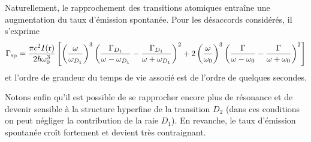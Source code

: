 Naturellement, le rapprochement des transitions atomiques entraîne une augmentation du taux d'émission spontanée. Pour les désaccords considérés, il s'exprime
\begin{equation}
\Gamma_{\mathrm{sp}}=\frac{\pi c^2 I(\mathrm{r})}{2 \hslash \omega_0^3} \left[ \left(\frac{\omega}{\omega_{D_1}} \right)^3 \left( \frac{\Gamma_{D_1}}{\omega-\omega_{D_1}} - \frac{\Gamma_{D_1}}{\omega+\omega_{D_1}} \right)^2 + 2\left( \frac{\omega}{\omega_0} \right)^3 \left( \frac{\Gamma}{\omega-\omega_0}-\frac{\Gamma}{\omega+\omega_0} \right)^2 \right]
\end{equation}
et l'ordre de grandeur du temps de vie associé est de l'ordre de quelques secondes.


Notons enfin qu'il est possible de se rapprocher encore plus de résonance et de devenir sensible à la structure hyperfine de la transition $D_2$ (dans ces conditions on peut négliger la contribution de la raie $D_1$). En revanche, le taux d'émission spontanée croît fortement et devient très contraignant.

